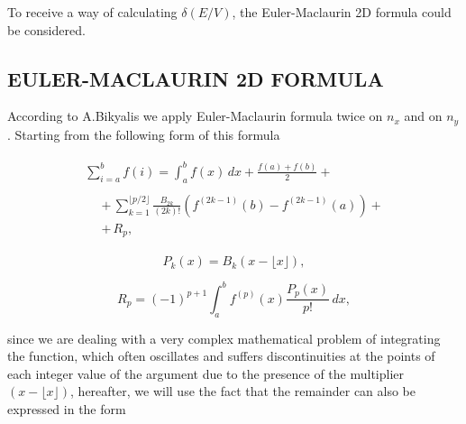 \documentclass[twoside, 10pt, ptm]{article}
\def\myvspacebeforesubsection{-2.0mm}
\def\myvspaceaftersubsection{-2.5mm}
\begin{document}
\begin{multicols}{2}
    To receive a way of calculating \(\delta\left(E/V\right)\), the Euler-Maclaurin 2D formula
could be considered.


\vspace{\myvspacebeforesubsection}
\subsection*{\centering\uppercase{Euler-Maclaurin 2D formula}}\label{eulermaclaurin-2d-formula}
\vspace{\myvspaceaftersubsection}


According to A.Bikyalis \cite{Bikyalis1968} we apply Euler-Maclaurin
formula twice on \(n_x\) and on \(n_y\). Starting from the following form of this formula


    \begin{equation} \label{eq:7}
\begin{array}{l}
\begin{array}{ll}
\displaystyle \sum _{i=a}^{b}f(i)= \int_{a}^{b}f(x)\,dx+{\frac {f(a)+f(b)}{2}} + & \,\,\,\,
\end{array}  \\
\begin{array}{rr}
\,\,\, & +\,\sum_{k=1}^{\lfloor p/2\rfloor }{\frac {B_{2k}}{(2k)!}}\left(f^{(2k-1)}(b)-f^{(2k-1)}(a)\right)+ \\
\,\,\, & + \,R_{p},
\end{array}
\end{array}\end{equation}

\begin{equation} \label{eq:8}
{\displaystyle P_{k}(x)=B_{k}\left(x-\lfloor x\rfloor \right),}
\end{equation}

\begin{equation} \label{eq:9}
{\displaystyle R_{p}=(-1)^{p+1}\int_{a}^{b}f^{(p)}(x){\frac {P_{p}(x)}{p!}}\,dx},
\end{equation}

since we are dealing with a very complex mathematical
problem of integrating the function, which often oscillates and
suffers discontinuities at the points of each integer value of the
argument due to the presence of the multiplier \((x-\lfloor x\rfloor )\), hereafter,
we will use the fact that the remainder can also
be expressed in the form


\end{multicols}
\end{document}
